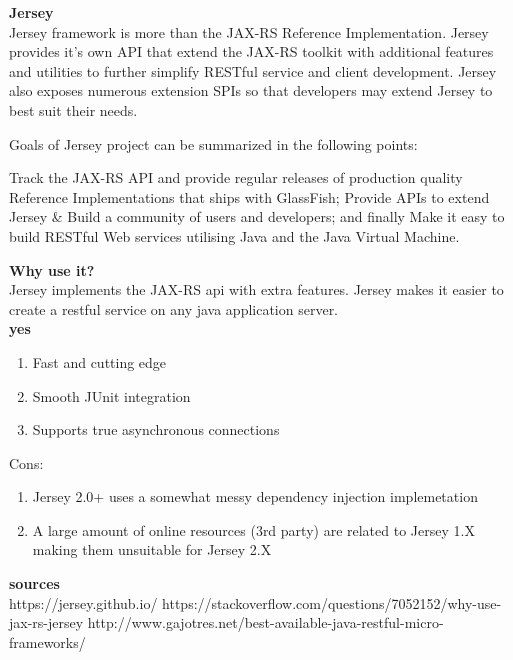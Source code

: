 \textbf{Jersey}\\
Jersey framework is more than the JAX-RS Reference Implementation. Jersey provides it's own API that extend the JAX-RS toolkit with additional features and utilities to further simplify RESTful service and client development. Jersey also exposes numerous extension SPIs so that developers may extend Jersey to best suit their needs.

Goals of Jersey project can be summarized in the following points:

Track the JAX-RS API and provide regular releases of production quality Reference Implementations that ships with GlassFish;
Provide APIs to extend Jersey \& Build a community of users and developers; and finally
Make it easy to build RESTful Web services utilising Java and the Java Virtual Machine.


\textbf{Why use it?} \\
Jersey implements the JAX-RS api with extra features. Jersey makes it easier to create a restful service on any java application server. \\

\textbf{yes}

\begin{enumerate}
	\item Fast and cutting edge
	\item Smooth JUnit integration
	\item Supports true asynchronous connections
\end{enumerate}
Cons:
\begin{enumerate}
	\item Jersey 2.0+ uses a somewhat messy dependency injection implemetation
	\item A large amount of online resources (3rd party) are related to Jersey 1.X making them unsuitable for Jersey 2.X
\end{enumerate}

\textbf{sources}\\
https://jersey.github.io/
https://stackoverflow.com/questions/7052152/why-use-jax-rs-jersey
http://www.gajotres.net/best-available-java-restful-micro-frameworks/